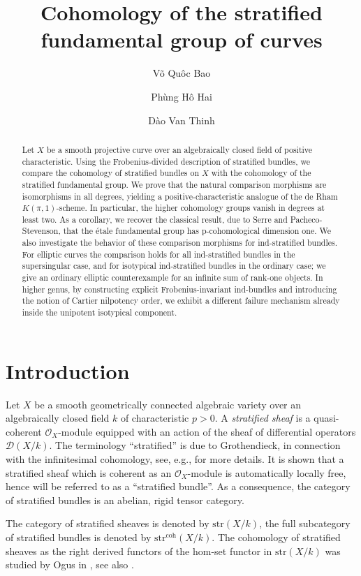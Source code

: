 \documentclass[12pt,a4]{amsart}
\author[VQ Bao]{V\~o Qu\^oc Bao}
\author[PH Hai]{Ph\`ung H\^o Hai}
\author[DV Thinh]{D\`ao Van Thinh}
\title[Cohomology of the stratified fundamental group]{Cohomology of the stratified fundamental group of curves}
\theoremstyle{definition}
\begin{document}
\maketitle
\begin{abstract}
	Let \(X\) be a smooth projective curve over an algebraically closed field of positive characteristic. Using the Frobenius-divided description of stratified bundles, we compare the cohomology of  stratified bundles on \(X\) with the cohomology of the stratified fundamental group. We prove that the natural comparison morphisms are isomorphisms in all degrees, yielding a positive-characteristic analogue of the de Rham  \(K(\pi,1)\)-scheme. In particular, the higher cohomology groups vanish in degrees at least two. As a corollary, we recover the classical result, due to Serre and Pacheco-Stevenson, that the étale fundamental group has p-cohomological dimension one. We also investigate the behavior of these comparison morphisms for ind-stratified bundles. For elliptic curves the comparison holds for all ind-stratified bundles in the supersingular case, and for isotypical ind-stratified bundles in the ordinary case; we give an ordinary elliptic counterexample for an infinite sum of rank-one objects. In higher genus, by constructing explicit Frobenius-invariant ind-bundles and introducing the notion of Cartier nilpotency order, we exhibit a different failure mechanism already inside the unipotent isotypical component.
\end{abstract}


\section{Introduction}
Let $X$ be a smooth geometrically connected algebraic variety over an algebraically
closed field $k$ of characteristic $p>0$. 
A \textit{stratified sheaf} is a quasi-coherent $\mathcal O_X$-module equipped with an action of the sheaf
of differential operators $\mathcal D (X/k)$. The terminology ``stratified'' is due to Grothendieck,
in connection with the infinitesimal cohomology,
see, e.g., \cite[Section~2]{BO78} for more details. It is shown that a stratified sheaf which is
coherent as an $\mathcal O_X$-module is automatically locally free, hence will be referred to as a
``stratified bundle''. As a consequence, the category of stratified bundles is an abelian, rigid tensor
category.

The category of stratified sheaves is denoted by
$\mathrm{str}(X/k)$, the full subcategory  of stratified bundles is denoted by
$\mathrm{str}^\mathrm{coh}(X/k)$. The cohomology of stratified sheaves as the right derived
functors of the hom-set functor in $\mathrm{str}(X/k)$ was studied by Ogus in \cite{Og75}, see
also \cite{Hai13}. 
 
\end{document}
